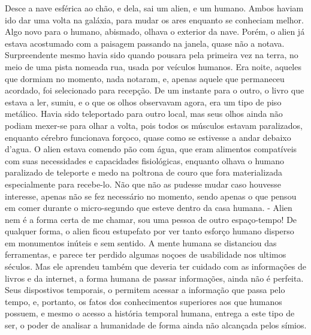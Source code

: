 
Desce a nave esférica ao chão, e dela, sai um alien, e um humano.
	Ambos haviam ido dar uma volta na galáxia, para mudar os ares enquanto se conheciam melhor.
	Algo novo para o humano, abismado, olhava o exterior da nave. Porém, o alien já estava acostumado com a paisagem passando na janela, quase não a notava. 
	Surpreendente mesmo havia sido quando pousara pela primeira vez na terra,
no meio de uma pista nomeada rua, usada por veículos humanos. Era noite, aqueles que dormiam no momento, nada notaram, e, apenas aquele que permaneceu acordado, foi selecionado para recepção. 
	De um instante para o outro, o livro que estava a ler, sumiu, e o que os olhos observavam agora, era um tipo de piso metálico. Havia sido teleportado para outro local, mas seus olhos ainda não podiam mexer-se para olhar a volta, pois todos os músculos estavam paralizados, enquanto cérebro funcionava forçoco, quase como se estivesse a andar debaixo d'agua.
	O alien estava comendo pão com água, que eram alimentos compatíveis com suas necessidades e capacidades fisiológicas, enquanto olhava o humano paralizado de teleporte e medo na poltrona de couro que fora materializada especialmente para recebe-lo. Não que não as pudesse mudar caso houvesse interesse, apenas não se fez necessário no momento,  sendo apenas o que pensou em comer durante o micro-segundo que esteve dentro da casa humana. 
	- Alien nem é a forma certa de me chamar, sou uma pessoa de outro espaço-tempo!
	De qualquer forma, o alien ficou estupefato por ver tanto esforço humano disperso em monumentos inúteis e sem sentido. A mente humana se distanciou das ferramentas, e parece ter perdido algumas noçoes de usabilidade nos ultimos séculos. Mas ele aprendeu também que deveria ter cuidado com as informações de livros e da internet, a forma humana de passar informações, ainda não é perfeita. Seus dispostivos temporais, o permitem acessar a informação que passa pelo tempo, e, portanto, os fatos dos conhecimentos superiores aos que humanos possuem, e mesmo o acesso a história temporal humana, entrega a este tipo de ser, o poder de analisar a humanidade de forma ainda não alcançada pelos símios. 
